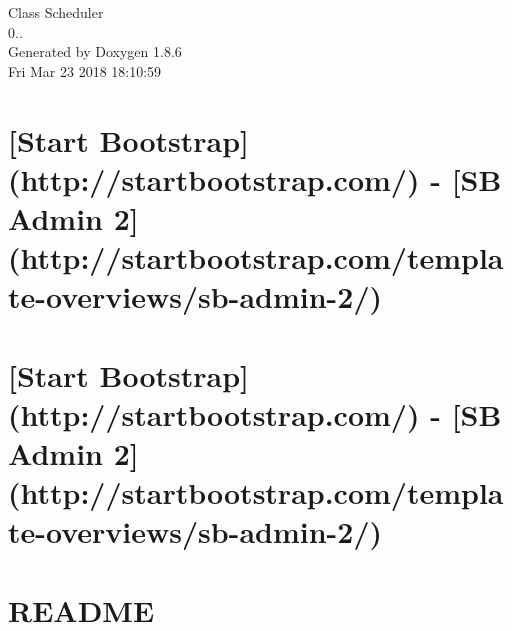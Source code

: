 \documentclass[twoside]{book}
\newcommand{\clearemptydoublepage}{%
  \newpage{\pagestyle{empty}\cleardoublepage}%
}
\begin{document}
\hypersetup{pageanchor=false}
\begin{titlepage}
\vspace*{7cm}
\begin{center}%
{\Large Class Scheduler \\[1ex]\large 0.. }\\
\vspace*{1cm}
{\large Generated by Doxygen 1.8.6}\\
\vspace*{0.5cm}
{\small Fri Mar 23 2018 18:10:59}\\
\end{center}
\end{titlepage}
\clearemptydoublepage
\tableofcontents
\clearemptydoublepage
{}
\hypersetup{pageanchor=true}

\chapter{\mbox{[}Start Bootstrap\mbox{]}(http\-://startbootstrap.com/) -\/ \mbox{[}S\-B Admin 2\mbox{]}(http\-://startbootstrap.com/template-\/overviews/sb-\/admin-\/2/)}
\label{md__home_travis_build__open-_source-_software-_development_class-scheduler_mysite_faculty_data_t969cd63fba649490953be8fc2cc67ea9}
\hypertarget{md__home_travis_build__open-_source-_software-_development_class-scheduler_mysite_faculty_data_t969cd63fba649490953be8fc2cc67ea9}{}

\chapter{\mbox{[}Start Bootstrap\mbox{]}(http\-://startbootstrap.com/) -\/ \mbox{[}S\-B Admin 2\mbox{]}(http\-://startbootstrap.com/template-\/overviews/sb-\/admin-\/2/)}
\label{md__home_travis_build__open-_source-_software-_development_class-scheduler_mysite_polls_template6b25d0f788b6aaccddd1af3595bcde07}
\hypertarget{md__home_travis_build__open-_source-_software-_development_class-scheduler_mysite_polls_template6b25d0f788b6aaccddd1af3595bcde07}{}

\chapter{R\-E\-A\-D\-M\-E}
\label{md__home_travis_build__open-_source-_software-_development_class-scheduler__r_e_a_d_m_e}
\hypertarget{md__home_travis_build__open-_source-_software-_development_class-scheduler__r_e_a_d_m_e}{}

\end{document}
